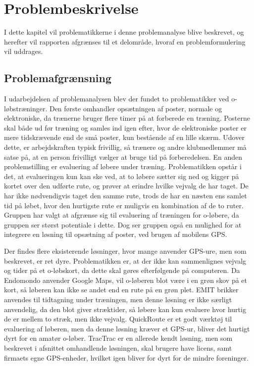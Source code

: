 \chapter{Problembeskrivelse}
I dette kapitel vil problematikkerne i denne problemanalyse blive beskrevet, og herefter vil rapporten afgrænses til et delområde, hvoraf en problemformulering vil uddrages.

\section{Problemafgrænsning}
I udarbejdelsen af problemanalysen blev der fundet to problematikker ved o-løbstræninger. Den første omhandler opsætningen af poster, normale og elektroniske, da trænerne bruger flere timer på at forberede en træning. Posterne skal både ud før træning og samles ind igen efter, hvor de elektroniske poster er mere tidskrævende end de små poster, kun bestående af en lille skærm. Udover dette, er arbejdskraften typisk frivillig, så trænere og andre klubmedlemmer må satse på, at en person frivilligt vælger at bruge tid på forberedelsen. En anden problemstilling er evaluering af løbere under træning. Problematikken opstår i det, at evalueringen kun kan ske ved, at to løbere sætter sig ned og kigger på kortet over den udførte rute, og prøver at erindre hvilke vejvalg de har taget. De har ikke nødvendigvis taget den samme rute, trods de har en næsten ens samlet tid på løbet, hvor den hurtigste rute er muligvis en kombination af de to ruter. Gruppen har valgt at afgrænse sig til evaluering af træningen for o-løbere, da gruppen ser størst potentiale i dette. Dog ser gruppen også en mulighed for at integrere en løsning til opsætning af poster, ved brugen af mobilens GPS. 

Der findes flere eksisterende løsninger, hvor mange anvender GPS-ure, men som beskrevet, er ret dyre. Problematikken er, at der ikke kan sammenlignes vejvalg og tider på et o-løbskort, da dette skal gøres efterfølgende på computeren. Da Endomondo anvender Google Maps, vil o-løberen blot være i en grøn skov på et kort, så løberen kan ikke se andet end en rute på en grøn plet. EMIT brikker anvendes til tidtagning under træningen, men denne løsning er ikke særligt anvendelig, da den blot giver stræktider, så løbere kan kun evaluere hvor hurtig de er mellem to stræk, men ikke vejvalg. QuickRoute er et godt værktøj til evaluering af løberen, men da denne løsning kræver et GPS-ur, bliver det hurtigt dyrt for en amatør o-løber.
TracTrac er en allerede kendt løsning, men som beskrevet i afsnittet omhandlende løsningen, skal brugere have licens, samt firmaets egne GPS-enheder, hvilket igen bliver for dyrt for de mindre foreninger.

